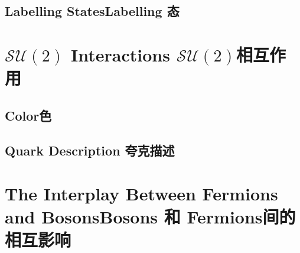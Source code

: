 \subsection[Labelling 态]{Labelling States\quad Labelling 态}\label{sec7.7.1}

\section[$\mathcal{SU}(3)$相互作用]{$\mathcal{SU}(2)$ Interactions \quad $\mathcal{SU}(2)$相互作用}\label{sec7.8}

\subsection[色]{Color\quad 色}\label{sec7.8.1}

\subsection[夸克描述]{Quark Description \quad 夸克描述}\label{sec7.8.2}

\section[Bosons 和 Fermions 间的相互影响]{The Interplay Between Fermions and Bosons\quad Bosons 和 Fermions间的相互影响}\label{sec7.9}
